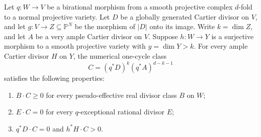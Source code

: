 \begin{lemma}\label{lem:mixed-positivity}
Let $q\colon W\to V$ be a birational morphism from a smooth
projective complex $d$-fold to a normal projective variety.
Let $D$ be a globally generated Cartier divisor on $V$, and let
$g\colon V\to Z\subseteq\mathbb P^N$ be the morphism of $|D|$
onto its image. Write $k=\dim Z$, and let $A$ be a very ample
Cartier divisor on $V$. Suppose $h\colon W\to Y$ is a surjective
morphism to a smooth projective variety with $y=\dim Y>k$.
For every ample Cartier divisor $H$ on $Y$, the numerical one-cycle
class
\[
 C=(q^*D)^k(q^*A)^{d-k-1}
\]
satisfies the following properties:
\begin{enumerate}
 \item $B\cdot C\geq0$ for every pseudo-effective real divisor
 class $B$ on $W$;
 \item $E\cdot C=0$ for every $q$-exceptional rational divisor $E$;
 \item $q^*D\cdot C=0$ and $h^*H\cdot C>0$.
\end{enumerate}
\end{lemma}

